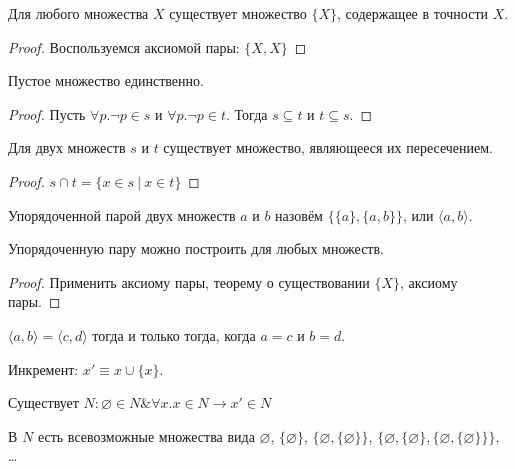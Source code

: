 \begin{theorem}
   Для любого множества $X$ существует множество $\{X\}$, содержащее в точности $X$.
\end{theorem}
\begin{proof}Воспользуемся аксиомой пары: $\{X,X\}$\end{proof}

\begin{theorem}Пустое множество единственно.\end{theorem}
\begin{proof}Пусть $\forall p.\neg p \in s$ и $\forall p.\neg p \in t$.
Тогда $s \subseteq t$ и $t \subseteq s$.\end{proof}

\begin{theorem}Для двух множеств $s$ и $t$ существует множество, являющееся их пересечением.\end{theorem}
\begin{proof}$s \cap t = \{ x\in s\ |\ x \in t\}$\end{proof}


\begin{definition}
   Упорядоченной парой двух множеств $a$ и $b$ назовём
$\{\{a\},\{a,b\}\}$, или $\langle{}a,b\rangle$.
\end{definition}

\begin{theorem}
Упорядоченную пару можно построить для любых множеств.
\end{theorem}
\begin{proof}
   Применить аксиому пары, теорему о существовании $\{X\}$, аксиому пары.
\end{proof}

\begin{theorem}
$\langle a,b \rangle = \langle c, d\rangle$ тогда и только тогда,
когда $a = c$ и $b = d$.
\end{theorem}

\begin{definition}
   Инкремент: $x' \equiv x \cup \{x\}$.
\end{definition}
\begin{definition}

   Существует $N: \varnothing \in N \& \forall x.x \in N\rightarrow x' \in N$\end{definition}

   В $N$ есть всевозможные множества вида $\varnothing$, $\{\varnothing\}$, $\{\varnothing,\{\varnothing\}\}$,
$\{\varnothing,\{\varnothing\},\{\varnothing,\{\varnothing\}\}\}$, \dots

